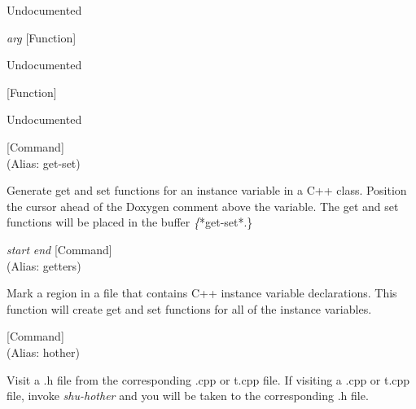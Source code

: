 \begin{doc-string}
Undocumented
\end{doc-string}

\vspace{1em}
\noindent
{}
\usebox{\funcname}\emph{arg}
 \hfill [Function]

\begin{doc-string}
Undocumented
\end{doc-string}

\vspace{1em}
\noindent
{}
\usebox{\funcname}
 \hfill [Function]

\begin{doc-string}
Undocumented
\end{doc-string}

\vspace{1em}
\noindent
{}
\usebox{\funcname}
 \hfill [Command]\\%
 (Alias: get-set)

\begin{doc-string}
Generate get and set functions for an instance variable in a C++ class.
Position the cursor ahead of the Doxygen comment above the variable.  The get
and set functions will be placed in the buffer \emph\{*get-set*.\}
\end{doc-string}

\vspace{1em}
\noindent
{}
\usebox{\funcname}\emph{start} \emph{end}
 \hfill [Command]\\%
 (Alias: getters)

\begin{doc-string}
Mark a region in a file that contains C++ instance variable declarations.
This function will create get and set functions for all of the instance
variables.
\end{doc-string}

\vspace{1em}
\noindent
{}
\usebox{\funcname}
 \hfill [Command]\\%
 (Alias: hother)

\begin{doc-string}
Visit a .h file from the corresponding .cpp or t.cpp file.  If visiting a .cpp or
t.cpp file, invoke \emph{shu-hother} and you will be taken to the corresponding .h file.
\end{doc-string}


